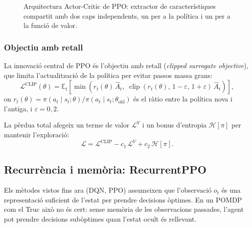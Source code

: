 \begin{figure}[H]
  \centering
  \caption{Arquitectura Actor-Critic de \acs{PPO}: extractor de característiques compartit amb dos caps independents, un per a la política i un per a la funció de valor.}
  \label{fig:actor-critic}
\end{figure}

\subsubsection*{Objectiu amb retall}

La innovació central de PPO és l'objectiu amb retall (\emph{clipped
surrogate objective}), que limita l'actualització de la política per evitar
passos massa grans:
\[
  \mathcal{L}^{\mathrm{CLIP}}(\theta) =
  \mathbb{E}_t\!\left[
    \min\!\left(
      r_t(\theta)\,\hat{A}_t,\;
      \operatorname{clip}(r_t(\theta),\,1-\varepsilon,\,1+\varepsilon)\,\hat{A}_t
    \right)
  \right],
\]
on $r_t(\theta) = \pi(a_t \mid s_t; \theta) / \pi(a_t \mid s_t; \theta_{\mathrm{old}})$
és el ràtio entre la política nova i l'antiga, i $\varepsilon = 0{,}2$.

La pèrdua total afegeix un terme de valor $\mathcal{L}^{V}$ i un bonus
d'entropia $\mathcal{H}[\pi]$ per mantenir l'exploració:
\[
  \mathcal{L} = \mathcal{L}^{\mathrm{CLIP}} - c_1\,\mathcal{L}^{V}
  + c_2\,\mathcal{H}[\pi].
\]

\subsection{Recurrència i memòria: RecurrentPPO}
\label{sec:recurrencia}

Els mètodes vistos fins ara (\ac{DQN}, \ac{PPO}) assumeixen que l'observació $o_t$ és una
representació suficient de l'estat per prendre decisions òptimes. En un \ac{POMDP} com el
Truc això no és cert: sense memòria de les observacions passades, l'agent pot prendre
decisions subòptimes quan l'estat ocult és rellevant.

